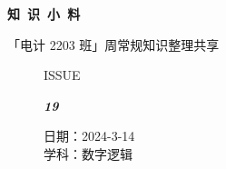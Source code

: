 \documentclass[UTF8]{ctexart}
\newcommand\Black[1]{\textcolor[gray]{0.3}{#1}}
\newcommand\Brown[1]{\textcolor[HTML]{998A4E}{#1}}
\newcommand\IssueNumber{19}
\newcommand\Date{2024-3-14}
\newcommand\Subject{数字逻辑}
\begin{document}
\BgThispage
\begin{center}
\phantom{...}

{\Large\textcolor{brown!40!white}{}}

\vspace{-2em}

{\Huge\bfseries\TitleFont \Black{知\ 识\ 小\ 料}}


\vspace{-0.1cm}
{\footnotesize \Brown{「电计 2203 班」周常规知识整理共享}}
\end{center}

\vspace{-0.5cm}

\begin{figure}[H]
\hspace{1cm}
\begin{minipage}[t]{0.3\textwidth}
\centering
    \Brown{\Genshin ISSUE}

    \vspace{-0.6cm}
    \Huge \Issue\slshape\bfseries\Black{\IssueNumber}
\end{minipage}
\hfill
\begin{minipage}[t]{0.35\textwidth}
\centering
    \Brown{日期：\Date} \\
\vspace{-0.1cm}
    \Brown{学科：\Subject} \\
\end{minipage}
\hspace{0.8cm}
\end{figure}
\end{document}

